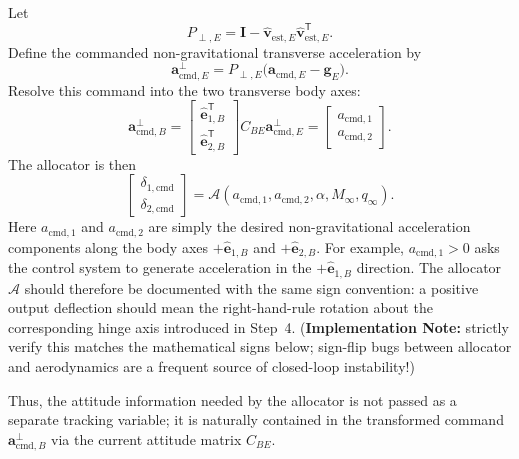 Let
\begin{equation}
P_{\perp,E}
=
\mathbf I-\hat{\mathbf v}_{\mathrm{est},E}\hat{\mathbf v}_{\mathrm{est},E}^{\mathsf T}. \label{eq:projection_matrix}
\end{equation}
Define the commanded non-gravitational transverse acceleration by
\begin{equation}
\mathbf a^{\perp}_{\mathrm{cmd},E}
=
P_{\perp,E}\bigl(\mathbf a_{\mathrm{cmd},E}-\mathbf g_E\bigr).
\end{equation}
Resolve this command into the two transverse body axes:
\begin{equation}
\mathbf a^{\perp}_{\mathrm{cmd},B}
=
\begin{bmatrix}
\hat{\mathbf e}_{1,B}^{\mathsf T}\\[2pt]
\hat{\mathbf e}_{2,B}^{\mathsf T}
\end{bmatrix}
C_{BE}\mathbf a^{\perp}_{\mathrm{cmd},E}
=
\begin{bmatrix}
a_{\mathrm{cmd},1}\\[2pt]
a_{\mathrm{cmd},2}
\end{bmatrix}. \label{eq:accel_body_resolved}
\end{equation}
The allocator is then
\begin{equation}
\begin{bmatrix}
\delta_{1,\mathrm{cmd}}\\[2pt]
\delta_{2,\mathrm{cmd}}
\end{bmatrix}
=
\mathcal A\!\left(
a_{\mathrm{cmd},1},
a_{\mathrm{cmd},2},
\alpha,
M_\infty,
q_\infty
\right). \label{eq:allocator_func}
\end{equation}
Here \(a_{\mathrm{cmd},1}\) and \(a_{\mathrm{cmd},2}\) are simply the desired non-gravitational acceleration components along the body axes \(+\hat{\mathbf e}_{1,B}\) and \(+\hat{\mathbf e}_{2,B}\). For example, \(a_{\mathrm{cmd},1}>0\) asks the control system to generate acceleration in the \(+\hat{\mathbf e}_{1,B}\) direction. The allocator \(\mathcal A\) should therefore be documented with the same sign convention: a positive output deflection should mean the right-hand-rule rotation about the corresponding hinge axis introduced in Step~4. (\textbf{Implementation Note:} strictly verify this matches the mathematical signs below; sign-flip bugs between allocator and aerodynamics are a frequent source of closed-loop instability!)

Thus, the attitude information needed by the allocator is not passed as a separate tracking variable; it is naturally contained in the transformed command \(\mathbf a^{\perp}_{\mathrm{cmd},B}\) via the current attitude matrix \(C_{BE}\).

